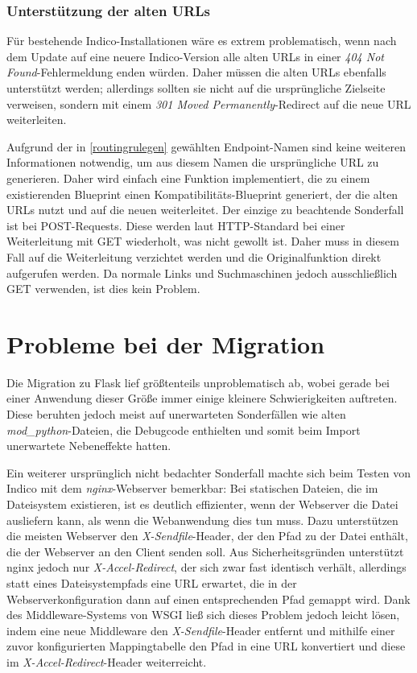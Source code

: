 \subsubsection{Unterstützung der alten URLs}

Für bestehende Indico-Installationen wäre es extrem problematisch, wenn nach dem Update auf eine
neuere Indico-Version alle alten URLs in einer \emph{404 Not Found}-Fehlermeldung enden würden.
Daher müssen die alten URLs ebenfalls unterstützt werden; allerdings sollten sie nicht auf die
ursprüngliche Zielseite verweisen, sondern mit einem \emph{301 Moved Permanently}-Redirect auf die
neue URL weiterleiten.

Aufgrund der in \autoref{routingrulegen} gewählten Endpoint-Namen sind keine weiteren Informationen
notwendig, um aus diesem Namen die ursprüngliche URL zu generieren. Daher wird einfach eine Funktion
implementiert, die zu einem existierenden Blueprint einen Kompatibilitäts-Blueprint
generiert, der die alten URLs nutzt und auf die neuen weiterleitet. Der einzige zu beachtende
Sonderfall ist bei POST-Requests. Diese werden laut HTTP-Standard bei einer Weiterleitung mit GET
wiederholt, was nicht gewollt ist. Daher muss in diesem Fall auf die Weiterleitung verzichtet werden
und die Originalfunktion direkt aufgerufen werden. Da normale Links und Suchmaschinen jedoch
ausschließlich GET verwenden, ist dies kein Problem.


\section{Probleme bei der Migration}

Die Migration zu Flask lief größtenteils unproblematisch ab, wobei gerade bei einer Anwendung dieser
Größe immer einige kleinere Schwierigkeiten auftreten. Diese beruhten jedoch meist auf unerwarteten
Sonderfällen wie alten \emph{mod\_python}-Dateien, die Debugcode enthielten und somit beim Import
unerwartete Nebeneffekte hatten.

Ein weiterer ursprünglich nicht bedachter Sonderfall machte sich beim Testen von Indico mit dem
\emph{nginx}-Webserver bemerkbar: Bei statischen Dateien, die im Dateisystem existieren, ist es
deutlich effizienter, wenn der Webserver die Datei ausliefern kann, als wenn die Webanwendung dies
tun muss. Dazu unterstützen die meisten Webserver den \emph{X-Sendfile}-Header, der den Pfad zu der
Datei enthält, die der Webserver an den Client senden soll. Aus Sicherheitsgründen unterstützt nginx
jedoch nur \emph{X-Accel-Redirect}, der sich zwar fast identisch verhält, allerdings statt eines
Dateisystempfads eine URL erwartet, die in der Webserverkonfiguration dann auf einen entsprechenden
Pfad gemappt wird. Dank des Middleware-Systems von WSGI ließ sich dieses Problem jedoch leicht
lösen, indem eine neue Middleware den \emph{X-Sendfile}-Header entfernt und mithilfe einer zuvor
konfigurierten Mappingtabelle den Pfad in eine URL konvertiert und diese im
\emph{X-Accel-Redirect}-Header weiterreicht.


